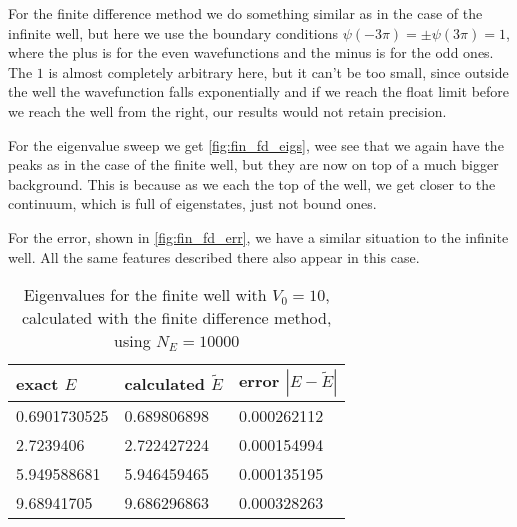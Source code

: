 \documentclass[10pt,a4paper,twocolumn]{article}
\begin{document}
For the finite difference method we do something similar as in the case of the infinite well, but here we use the boundary conditions $\psi(-3 \pi) = \pm \psi(3 \pi) = 1$, where the plus is for the even wavefunctions and the minus is for the odd ones. The $1$ is almost completely arbitrary here, but it can't be too small, since outside the well the wavefunction falls exponentially and if we reach the float limit before we reach the well from the right, our results would not retain precision.

For the eigenvalue sweep we get \cref{fig:fin_fd_eigs}, wee see that we again have the peaks as in the case of the finite well, but they are now on top of a much bigger background. This is because as we each the top of the well, we get closer to the continuum, which is full of eigenstates, just not bound ones.

For the error, shown in \cref{fig:fin_fd_err}, we have a similar situation to the infinite well. All the same features described there also appear in this case.

\begin{table}[]
    \begin{tabular}{|l|l||l|}
        \hline
        exact $E$    & calculated $\tilde{E}$ & error $|E - \tilde{E}|$\\ \hline\hline
        0.6901730525 & 0.689806898 & 0.000262112 \\ \hline
        2.7239406    & 2.722427224 & 0.000154994 \\ \hline
        5.949588681  & 5.946459465 & 0.000135195 \\ \hline
        9.68941705   & 9.686296863 & 0.000328263 \\ \hline
    \end{tabular}
    \caption{Eigenvalues for the finite well with $V_0=10$, calculated with the finite difference method, using $N_E = 10000$}
\end{table}

\nocite{BVP_gen}
\nocite{fin}

\printbibliography
\end{document}
